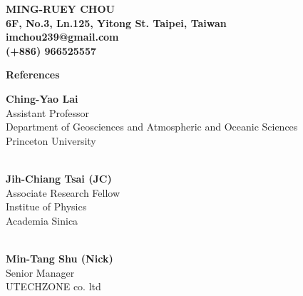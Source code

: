 \documentclass[10pt]{article}
\newcommand{\bwhref}[3][black]{\href{#2}{\color{#1}{#3}}}
\begin{document}
\begin{center}
\large\bf MING-RUEY CHOU\\ %
6F, No.3, Ln.125, Yitong St. Taipei, Taiwan\\imchou239@gmail.com\\(+886) 966525557%
\end{center} 

{\large\bf References} \\

\begin{minipage}[t]{1.0\linewidth}
    {\large\bf Ching-Yao Lai} \\
    Assistant Professor \\
    Department of Geosciences and Atmospheric and Oceanic Sciences \\
    Princeton University \\
    \Letter\ \bwhref{cylai@princeton.edu}{cylai@princeton.edu} \\
\end{minipage}

\begin{minipage}[t]{1.0\linewidth}
    {\large\bf Jih-Chiang Tsai (JC)} \\
    Associate Research Fellow \\
    Institue of Physics \\
    Academia Sinica\\
    \Letter\ \bwhref{jctsai@phys.sinica.edu.tw}{jctsai@phys.sinica.edu.tw} \\
\end{minipage}

\begin{minipage}[t]{1.0\linewidth}
    {\large\bf Min-Tang Shu (Nick) } \\
    Senior Manager \\
    UTECHZONE co. ltd\\
    \Letter\ \bwhref{nick@utechzone.com.tw}{nick@utechzone.com.tw} \\
\end{minipage}

\end{document}
